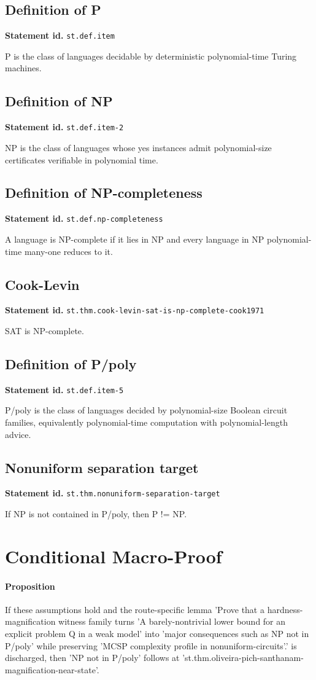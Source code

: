 \documentclass[11pt]{article}
\begin{document}
\subsection*{Definition of P}
\textbf{Statement id.} \texttt{st.def.item}

P is the class of languages decidable by deterministic polynomial-time Turing machines.
\subsection*{Definition of NP}
\textbf{Statement id.} \texttt{st.def.item-2}

NP is the class of languages whose yes instances admit polynomial-size certificates verifiable in polynomial time.
\subsection*{Definition of NP-completeness}
\textbf{Statement id.} \texttt{st.def.np-completeness}

A language is NP-complete if it lies in NP and every language in NP polynomial-time many-one reduces to it.
\subsection*{Cook-Levin}
\textbf{Statement id.} \texttt{st.thm.cook-levin-sat-is-np-complete-cook1971}

SAT is NP-complete.
\subsection*{Definition of P/poly}
\textbf{Statement id.} \texttt{st.def.item-5}

P/poly is the class of languages decided by polynomial-size Boolean circuit families, equivalently polynomial-time computation with polynomial-length advice.
\subsection*{Nonuniform separation target}
\textbf{Statement id.} \texttt{st.thm.nonuniform-separation-target}

If NP is not contained in P/poly, then P != NP.

\section{Conditional Macro-Proof}
\paragraph{Proposition}
If these assumptions hold and the route-specific lemma 'Prove that a hardness-magnification witness family turns 'A barely-nontrivial lower bound for an explicit problem Q in a weak model' into 'major consequences such as NP not in P/poly' while preserving 'MCSP complexity profile in nonuniform-circuits'.' is discharged, then 'NP not in P/poly' follows at 'st.thm.oliveira-pich-santhanam-magnification-near-state'.
\end{document}
